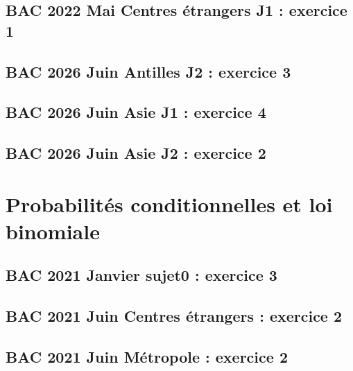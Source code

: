 \documentclass[lang=fr,edition=teacher,layout=sheet]{mxbook}
\begin{document}
\subsection*{BAC 2022 Mai Centres étrangers J1 : exercice 1}
\begingroup\endgroup
\par\bigskip
{}\subsection*{BAC 2026 Juin Antilles J2 : exercice 3}
\begingroup\endgroup
\par\bigskip
{}\subsection*{BAC 2026 Juin Asie J1 : exercice 4}
\begingroup\endgroup
\par\bigskip
{}\subsection*{BAC 2026 Juin Asie J2 : exercice 2}
\begingroup\endgroup
\par\bigskip
\clearpage\section*{Probabilités conditionnelles et loi binomiale}
\subsection*{BAC 2021 Janvier sujet0 : exercice 3}
\begingroup\endgroup
\par\bigskip
{}\subsection*{BAC 2021 Juin Centres étrangers : exercice 2}
\begingroup\endgroup
\par\bigskip
{}\subsection*{BAC 2021 Juin Métropole : exercice 2}
\end{document}
